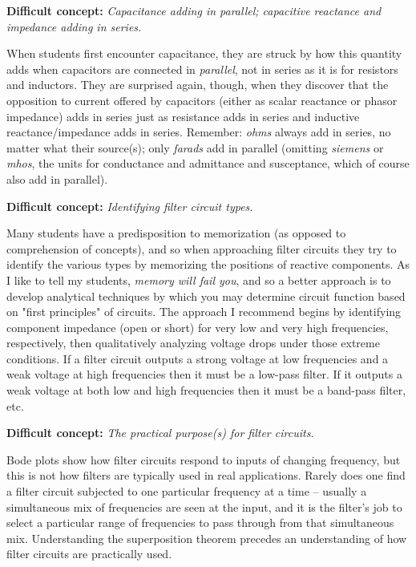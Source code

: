 \vskip 10pt

\noindent
{\bf Difficult concept: } {\it Capacitance adding in parallel; capacitive reactance and impedance adding in series.}

When students first encounter capacitance, they are struck by how this quantity adds when capacitors are connected in {\it parallel}, not in series as it is for resistors and inductors.  They are surprised again, though, when they discover that the opposition to current offered by capacitors (either as scalar reactance or phasor impedance) adds in series just as resistance adds in series and inductive reactance/impedance adds in series.  Remember: {\it ohms} always add in series, no matter what their source(s); only {\it farads} add in parallel (omitting {\it siemens} or {\it mhos}, the units for conductance and admittance and susceptance, which of course also add in parallel).

\vskip 10pt

\noindent
{\bf Difficult concept: } {\it Identifying filter circuit types.}

Many students have a predisposition to memorization (as opposed to comprehension of concepts), and so when approaching filter circuits they try to identify the various types by memorizing the positions of reactive components.  As I like to tell my students, {\it memory will fail you}, and so a better approach is to develop analytical techniques by which you may determine circuit function based on "first principles" of circuits.  The approach I recommend begins by identifying component impedance (open or short) for very low and very high frequencies, respectively, then qualitatively analyzing voltage drops under those extreme conditions.  If a filter circuit outputs a strong voltage at low frequencies and a weak voltage at high frequencies then it must be a low-pass filter.  If it outputs a weak voltage at both low and high frequencies then it must be a band-pass filter, etc.

\vskip 10pt

\noindent
{\bf Difficult concept: } {\it The practical purpose(s) for filter circuits.}

Bode plots show how filter circuits respond to inputs of changing frequency, but this is not how filters are typically used in real applications.  Rarely does one find a filter circuit subjected to one particular frequency at a time -- usually a simultaneous mix of frequencies are seen at the input, and it is the filter's job to select a particular range of frequencies to pass through from that simultaneous mix.  Understanding the superposition theorem precedes an understanding of how filter circuits are practically used.


